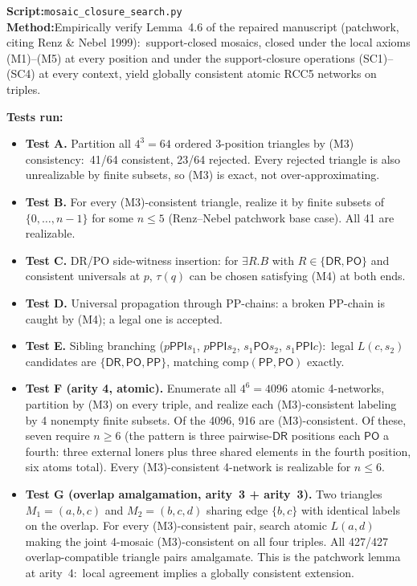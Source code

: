 \documentclass[11pt]{article}
\newcommand{\PP}{\mathsf{PP}}
\newcommand{\PPI}{\mathsf{PPI}}
\newcommand{\PO}{\mathsf{PO}}
\newcommand{\DR}{\mathsf{DR}}
\begin{document}
\textbf{Script:}\quad \texttt{mosaic\_closure\_search.py}\\
\textbf{Method:}\quad Empirically verify Lemma~4.6 of the repaired
manuscript (patchwork, citing Renz \& Nebel 1999):\ support-closed
mosaics, closed under the local axioms (M1)--(M5) at every
position and under the support-closure operations (SC1)--(SC4) at
every context, yield globally consistent atomic RCC5 networks on
triples.

\textbf{Tests run:}
\begin{itemize}[leftmargin=2em]
  \item \textbf{Test A.}  Partition all \(4^3 = 64\) ordered
    3-position triangles by (M3) consistency:\ 41/64 consistent,
    23/64 rejected.  Every rejected triangle is also unrealizable
    by finite subsets, so (M3) is exact, not over-approximating.
  \item \textbf{Test B.}  For every (M3)-consistent triangle,
    realize it by finite subsets of \(\{0,\dots,n-1\}\) for some
    \(n \le 5\) (Renz--Nebel patchwork base case).  All 41 are
    realizable.
  \item \textbf{Test C.}  DR/PO side-witness insertion: for
    \(\exists R.B\) with \(R \in \{\DR,\PO\}\) and consistent
    universals at \(p\), \(\tau(q)\) can be chosen satisfying
    (M4) at both ends.
  \item \textbf{Test D.}  Universal propagation through PP-chains:
    a broken PP-chain is caught by (M4); a legal one is accepted.
  \item \textbf{Test E.}  Sibling branching (\(p\PPI s_1\),
    \(p\PPI s_2\), \(s_1\PO s_2\), \(s_1\PPI c\)):\ legal
    \(L(c, s_2)\) candidates are \(\{\DR, \PO, \PP\}\), matching
    \(\mathrm{comp}(\PP, \PO)\) exactly.
  \item \textbf{Test F (arity 4, atomic).}  Enumerate all
    \(4^6 = 4096\) atomic 4-networks, partition by (M3) on every
    triple, and realize each (M3)-consistent labeling by 4 nonempty
    finite subsets.  Of the 4096, 916 are (M3)-consistent.  Of these,
    seven require \(n \ge 6\) (the pattern is three pairwise-\(\DR\)
    positions each \(\PO\) a fourth: three external loners plus
    three shared elements in the fourth position, six atoms total).
    Every (M3)-consistent 4-network is realizable for \(n \le 6\).
  \item \textbf{Test G (overlap amalgamation, arity~3 + arity~3).}
    Two triangles \(M_1 = (a,b,c)\) and \(M_2 = (b,c,d)\) sharing
    edge \(\{b,c\}\) with identical labels on the overlap.  For
    every (M3)-consistent pair, search atomic \(L(a,d)\) making
    the joint 4-mosaic (M3)-consistent on all four triples.  All
    427/427 overlap-compatible triangle pairs amalgamate.  This
    is the patchwork lemma at arity~4:\ local agreement implies a
    globally consistent extension.
\end{itemize}
\end{document}

